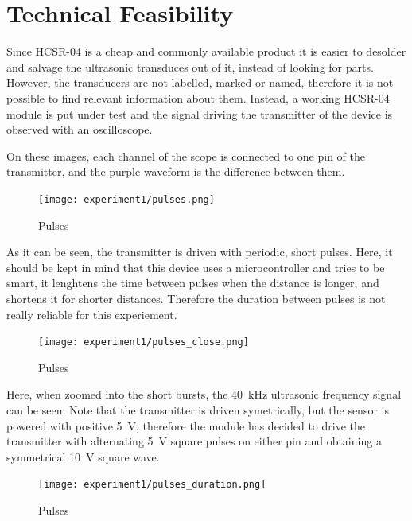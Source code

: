 \documentclass[12pt, a4paper]{article}
\begin{document}
    \section{Technical Feasibility}

        Since HCSR-04 is a cheap and commonly available product it is easier to desolder and salvage the ultrasonic transduces out of it, instead of looking for parts. However, the transducers are not labelled, marked or named, therefore it is not possible to find relevant information about them. Instead, a working HCSR-04 module is put under test and the signal driving the transmitter of the device is observed with an oscilloscope. 

        \noindent On these images, each channel of the scope is connected to one pin of the transmitter, and the purple waveform is the difference between them.

        \bigskip

        \begin{figure}[H]\centering
            \texttt{[image: experiment1/pulses.png]}
            \caption[]{Pulses}\label{fig:pulses}
        \end{figure}

        \noindent As it can be seen, the transmitter is driven with periodic, short pulses. Here, it should be kept in mind that this device uses a microcontroller and tries to be smart, it lenghtens the time between pulses when the distance is longer, and shortens it for shorter distances. Therefore the duration between pulses is not really reliable for this experiement. 

        \begin{figure}[H]\centering
            \texttt{[image: experiment1/pulses\_close.png]}
            \caption[]{Pulses}\label{fig:pulses}
        \end{figure}

        \noindent Here, when zoomed into the short bursts, the \SI{40}{\kilo\hertz} ultrasonic frequency signal can be seen. Note that the transmitter is driven symetrically, but the sensor is powered with positive \SI{5}{\volt}, therefore the module has decided to drive the transmitter with alternating \SI{5}{\volt} square pulses on either pin and obtaining a symmetrical \SI{10}{\volt} square wave. 

        \begin{figure}[H]\centering
            \texttt{[image: experiment1/pulses\_duration.png]}
            \caption[]{Pulses}\label{fig:pulses}
        \end{figure}
\end{document}

